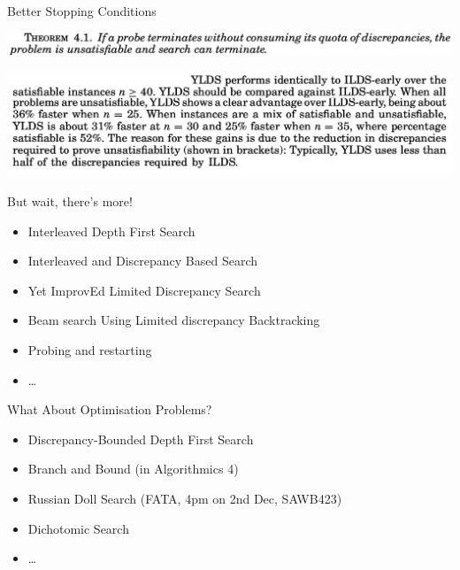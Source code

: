 \documentclass{beamer}
\begin{document}
\begin{frame}{Better Stopping Conditions}

    \centering\includegraphics*[keepaspectratio=true,scale=0.2]{images/stopping-theorem.png}

    \vspace{2em}

    \centering\includegraphics*[keepaspectratio=true,scale=0.2]{images/stopping-result.png}

\end{frame}

\begin{frame}{But wait, there's more!}
    \begin{itemize}
        \item Interleaved Depth First Search
        \item Interleaved and Discrepancy Based Search
        \item Yet ImprovEd Limited Discrepancy Search
        \item Beam search Using Limited discrepancy Backtracking
        \item Probing and restarting
        \item \ldots
    \end{itemize}
\end{frame}

\begin{frame}{What About Optimisation Problems?}
    \begin{itemize}
        \item Discrepancy-Bounded Depth First Search
        \item Branch and Bound (in Algorithmics 4)
        \item Russian Doll Search (FATA, 4pm on 2nd Dec, SAWB423)
        \item Dichotomic Search
        \item \ldots
    \end{itemize}
\end{frame}
\end{document}
